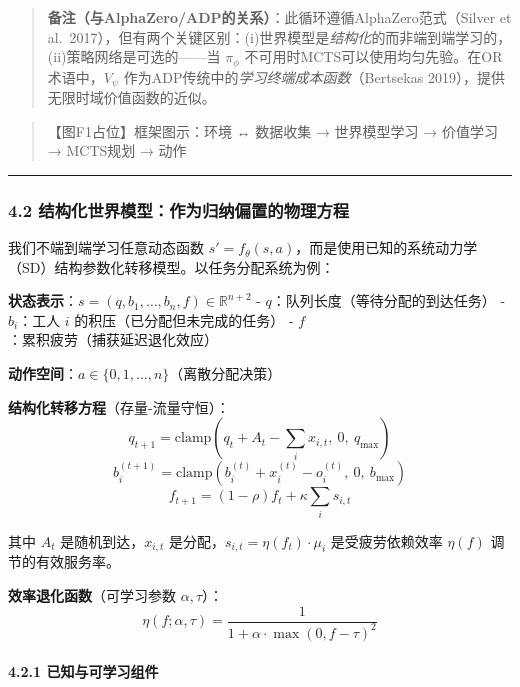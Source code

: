 \documentclass[UTF8]{ctexart}
\let\oldparagraph\paragraph
\renewcommand{\paragraph}[1]{\oldparagraph{#1}\mbox{}}
\begin{document}
\begin{quote}
\textbf{备注（与AlphaZero/ADP的关系）}：此循环遵循AlphaZero范式（Silver
et
al.~2017），但有两个关键区别：(i)世界模型是\emph{结构化}的而非端到端学习的，(ii)策略网络是可选的------当
\(\pi_\phi\) 不可用时MCTS可以使用均匀先验。在OR术语中，\(V_\psi\)
作为ADP传统中的\emph{学习终端成本函数}（Bertsekas
2019），提供无限时域价值函数的近似。
\end{quote}

\begin{quote}
【图F1占位】框架图示：环境 ↔ 数据收集 → 世界模型学习 → 价值学习 →
MCTS规划 → 动作
\end{quote}

\begin{center}\rule{0.5\linewidth}{0.4pt}\end{center}

\hypertarget{ux7ed3ux6784ux5316ux4e16ux754cux6a21ux578bux4f5cux4e3aux5f52ux7eb3ux504fux7f6eux7684ux7269ux7406ux65b9ux7a0b}{%
\subsubsection{4.2
结构化世界模型：作为归纳偏置的物理方程}\label{ux7ed3ux6784ux5316ux4e16ux754cux6a21ux578bux4f5cux4e3aux5f52ux7eb3ux504fux7f6eux7684ux7269ux7406ux65b9ux7a0b}}

我们不端到端学习任意动态函数
\(s' = f_\theta(s,a)\)，而是使用已知的系统动力学（SD）结构参数化转移模型。以任务分配系统为例：

\textbf{状态表示}：\(s = (q, b_1, \ldots, b_n, f) \in \mathbb{R}^{n+2}\)
- \(q\)：队列长度（等待分配的到达任务） - \(b_i\)：工人 \(i\)
的积压（已分配但未完成的任务） - \(f\)：累积疲劳（捕获延迟退化效应）

\textbf{动作空间}：\(a \in \{0, 1, \ldots, n\}\)（离散分配决策）

\textbf{结构化转移方程}（存量-流量守恒）： \[
q_{t+1} = \text{clamp}\left(q_t + A_t - \sum_i x_{i,t}, \ 0, \ q_{\max}\right)
\] \[
b_i^{(t+1)} = \text{clamp}\left(b_i^{(t)} + x_i^{(t)} - o_i^{(t)}, \ 0, \ b_{\max}\right)
\] \[
f_{t+1} = (1-\rho) f_t + \kappa \sum_i s_{i,t}
\]

其中 \(A_t\) 是随机到达，\(x_{i,t}\)
是分配，\(s_{i,t} = \eta(f_t) \cdot \mu_i\) 是受疲劳依赖效率 \(\eta(f)\)
调节的有效服务率。

\textbf{效率退化函数}（可学习参数 \(\alpha, \tau\)）： \[
\eta(f; \alpha, \tau) = \frac{1}{1 + \alpha \cdot \max(0, f - \tau)^2}
\]

\hypertarget{ux5df2ux77e5ux4e0eux53efux5b66ux4e60ux7ec4ux4ef6}{%
\paragraph{4.2.1
已知与可学习组件}\label{ux5df2ux77e5ux4e0eux53efux5b66ux4e60ux7ec4ux4ef6}}
\end{document}
